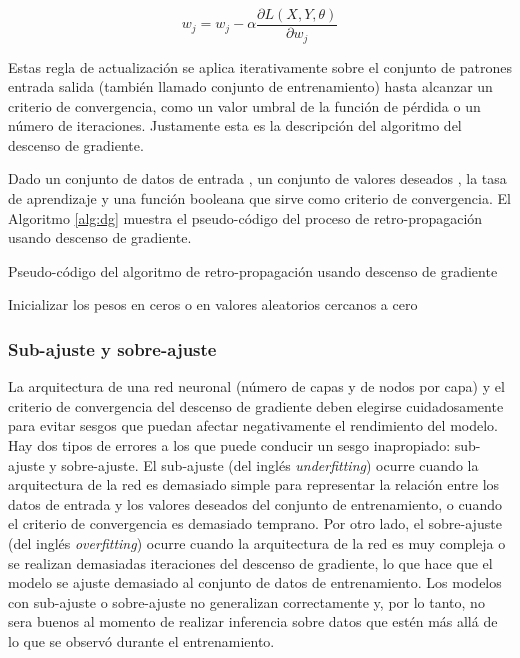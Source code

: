 \begin{equation}
    \label{eq:gd-update-rule-item}
    w_{j} = w_{j} - \alpha \frac{\partial L(X, Y, \theta)}{\partial w_{j}}
\end{equation}

Estas regla de actualización se aplica iterativamente sobre el conjunto de patrones entrada salida (también llamado conjunto de entrenamiento) hasta alcanzar un criterio de convergencia, como un valor umbral de la función de pérdida o un número de iteraciones. Justamente esta es la descripción del algoritmo del descenso de gradiente.

Dado un conjunto de datos de entrada , un conjunto de valores deseados , la tasa de aprendizaje \jim{\alpha} y una función booleana  que sirve como criterio de convergencia. El Algoritmo \ref{alg:dg} muestra el pseudo-código del proceso de retro-propagación usando descenso de gradiente.

\begin{algorithm}
\caption{Pseudo-código del algoritmo de retro-propagación usando descenso de gradiente}
\label{alg:dg}
\KwResult{\jim{\theta}}

Inicializar los pesos \jim{\theta} en ceros o en valores aleatorios cercanos a cero

\end{algorithm}

\subsubsection*{Sub-ajuste y sobre-ajuste}

La arquitectura de una red neuronal (número de capas y de nodos por capa) y el criterio de convergencia del descenso de gradiente deben elegirse cuidadosamente para evitar sesgos que puedan afectar negativamente el rendimiento del modelo. Hay dos tipos de errores a los que puede conducir un sesgo inapropiado: sub-ajuste y sobre-ajuste. El sub-ajuste (del inglés \textit{underfitting}) ocurre cuando la arquitectura de la red es demasiado simple para representar la relación entre los datos de entrada y los valores deseados del conjunto de entrenamiento, o cuando el criterio de convergencia es demasiado temprano. Por otro lado, el sobre-ajuste (del inglés \textit{overfitting}) ocurre cuando la arquitectura de la red es muy compleja o se realizan demasiadas iteraciones del descenso de gradiente, lo que hace que el modelo se ajuste demasiado al conjunto de datos de entrenamiento. Los modelos con sub-ajuste o sobre-ajuste no generalizan correctamente y, por lo tanto, no sera buenos al momento de realizar inferencia sobre datos que estén más allá de lo que se observó durante el entrenamiento.

